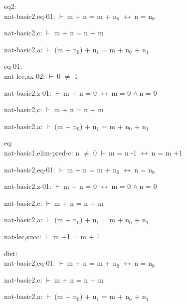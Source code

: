 \documentclass[a4paper]{article}
\newcommand{\Fol}{\mbox{$\vdash\ $}}
\newcommand{\And}{\mbox{$\wedge\ $}}
\newcommand{\Equiv}{\mbox{$\leftrightarrow\ $}}
\begin{document}
\bigskip

eq2:\\ nat-basic2,eq-01: 
 \Fol m + n = m + $\mbox{n}_{0}$ \Equiv n = $\mbox{n}_{0}$



nat-basic2,c: 
 \Fol m + n = n + m



nat-basic2,a: 
 \Fol (m + $\mbox{n}_{0}$) + $\mbox{n}_{1}$ = m + $\mbox{n}_{0}$ + $\mbox{n}_{1}$



\bigskip

eq-01:\\ nat-lec,ax-02: 
 \Fol 0 $\neq$ 1



nat-basic2,z-01: 
 \Fol m + n = 0 \Equiv m = 0 \And n = 0



nat-basic2,c: 
 \Fol m + n = n + m



nat-basic2,a: 
 \Fol (m + $\mbox{n}_{0}$) + $\mbox{n}_{1}$ = m + $\mbox{n}_{0}$ + $\mbox{n}_{1}$



\bigskip

eq:\\ nat-basic1,elim-pred-c: 
n $\neq$ 0
 \Fol m = n -1 \Equiv n = m +1



nat-basic2,eq-01: 
 \Fol m + n = m + $\mbox{n}_{0}$ \Equiv n = $\mbox{n}_{0}$



nat-basic2,z-01: 
 \Fol m + n = 0 \Equiv m = 0 \And n = 0



nat-basic2,c: 
 \Fol m + n = n + m



nat-basic2,a: 
 \Fol (m + $\mbox{n}_{0}$) + $\mbox{n}_{1}$ = m + $\mbox{n}_{0}$ + $\mbox{n}_{1}$



nat-lec,succ: 
 \Fol m +1 = m + 1



\bigskip

dist:\\ nat-basic2,eq-01: 
 \Fol m + n = m + $\mbox{n}_{0}$ \Equiv n = $\mbox{n}_{0}$



nat-basic2,c: 
 \Fol m + n = n + m



nat-basic2,a: 
 \Fol (m + $\mbox{n}_{0}$) + $\mbox{n}_{1}$ = m + $\mbox{n}_{0}$ + $\mbox{n}_{1}$
\end{document}
